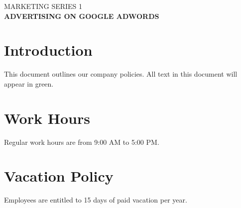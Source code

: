 \documentclass[letterpaper,12pt]{article}
\newcommand{\policyletter}[2]{%
	\begin{center}
		\vspace*{0.25\baselineskip} %
		{\large #1} \\ %
		\vspace{0.5\baselineskip} %
		{\LARGE \textbf{#2}} %
		\vspace{\baselineskip} %
	\end{center}
}
\begin{document}
	\thispagestyle{fancy}
	
	\policyletter{MARKETING SERIES 1}{ADVERTISING ON GOOGLE ADWORDS}
	
	\section{Introduction}
	This document outlines our company policies. All text in this document will appear in green.
	
	\section{Work Hours}
	Regular work hours are from 9:00 AM to 5:00 PM.
	
	\section{Vacation Policy}
	Employees are entitled to 15 days of paid vacation per year.
	
\end{document}
